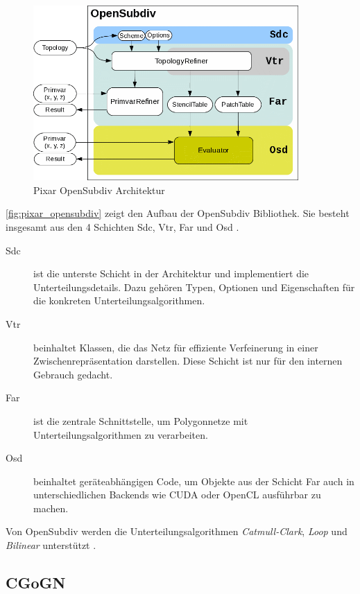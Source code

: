 \begin{figure}
  \centering
  \includegraphics[width=0.9\textwidth]{content/media/pixar_opensubdiv}
  \caption{Pixar OpenSubdiv Architektur \cite{Pixar.27.07.2015}}
  \label{fig:pixar_opensubdiv}
\end{figure}

\autoref{fig:pixar_opensubdiv} zeigt den Aufbau der OpenSubdiv Bibliothek.
Sie besteht insgesamt aus den 4 Schichten \ac{Sdc}, \ac{Vtr}, \ac{Far} und \ac{Osd} \cite{Pixar.27.07.2015}.

\begin{description}
 \item[\ac{Sdc}] ist die unterste Schicht in der Architektur und implementiert die Unterteilungsdetails.
 Dazu gehören Typen, Optionen und Eigenschaften für die konkreten Unterteilungsalgorithmen.
 \item[\ac{Vtr}] beinhaltet Klassen, die das Netz für effiziente Verfeinerung in einer Zwischenrepräsentation darstellen.
 Diese Schicht ist nur für den internen Gebrauch gedacht.
 \item[\ac{Far}] ist die zentrale Schnittstelle, um Polygonnetze mit Unterteilungsalgorithmen zu verarbeiten.
 \item[\ac{Osd}] beinhaltet geräteabhängigen Code, um Objekte aus der Schicht \ac{Far} auch in unterschiedlichen Backends wie
 \ac{CUDA} oder OpenCL ausführbar zu machen.
\end{description}

Von OpenSubdiv werden die Unterteilungsalgorithmen \emph{Catmull-Clark}, \emph{Loop} und \emph{Bilinear} unterstützt \cite{Pixar.27.07.2015}. 

\subsection{CGoGN}

